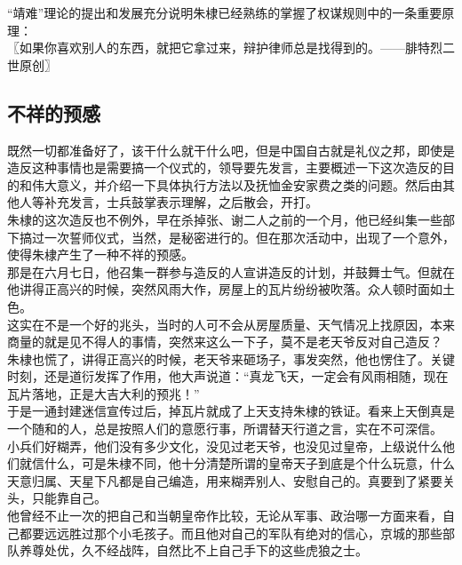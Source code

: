 \begin{multicols}{\theparacolNo}
“靖难”理论的提出和发展充分说明朱棣已经熟练的掌握了权谋规则中的一条重要原理：\\

〖如果你喜欢别人的东西，就把它拿过来，辩护律师总是找得到的。——腓特烈二世原创〗\\

\subsection{不祥的预感}
既然一切都准备好了，该干什么就干什么吧，但是中国自古就是礼仪之邦，即使是造反这种事情也是需要搞一个仪式的，领导要先发言，主要概述一下这次造反的目的和伟大意义，并介绍一下具体执行方法以及抚恤金安家费之类的问题。然后由其他人等补充发言，士兵鼓掌表示理解，之后散会，开打。\\

朱棣的这次造反也不例外，早在杀掉张、谢二人之前的一个月，他已经纠集一些部下搞过一次誓师仪式，当然，是秘密进行的。但在那次活动中，出现了一个意外，使得朱棣产生了一种不祥的预感。\\

那是在六月七日，他召集一群参与造反的人宣讲造反的计划，并鼓舞士气。但就在他讲得正高兴的时候，突然风雨大作，房屋上的瓦片纷纷被吹落。众人顿时面如土色。\\

这实在不是一个好的兆头，当时的人可不会从房屋质量、天气情况上找原因，本来商量的就是见不得人的事情，突然来这么一下子，莫不是老天爷反对自己造反？\\

朱棣也慌了，讲得正高兴的时候，老天爷来砸场子，事发突然，他也愣住了。关键时刻，还是道衍发挥了作用，他大声说道：“真龙飞天，一定会有风雨相随，现在瓦片落地，正是大吉大利的预兆！”\\

于是一通封建迷信宣传过后，掉瓦片就成了上天支持朱棣的铁证。看来上天倒真是一个随和的人，总是按照人们的意愿行事，所谓替天行道之言，实在不可深信。\\

小兵们好糊弄，他们没有多少文化，没见过老天爷，也没见过皇帝，上级说什么他们就信什么，可是朱棣不同，他十分清楚所谓的皇帝天子到底是个什么玩意，什么天意归属、天星下凡都是自己编造，用来糊弄别人、安慰自己的。真要到了紧要关头，只能靠自己。\\

他曾经不止一次的把自己和当朝皇帝作比较，无论从军事、政治哪一方面来看，自己都要远远胜过那个小毛孩子。而且他对自己的军队有绝对的信心，京城的那些部队养尊处优，久不经战阵，自然比不上自己手下的这些虎狼之士。\\


\end{multicols}
